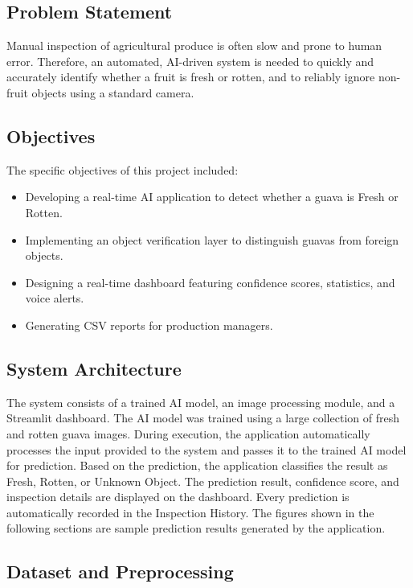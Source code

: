 \subsection{Problem Statement}

Manual inspection of agricultural produce is often slow and prone to human error. Therefore, an automated, AI-driven system is needed to quickly and accurately identify whether a fruit is fresh or rotten, and to reliably ignore non-fruit objects using a standard camera.

\subsection{Objectives}

The specific objectives of this project included:
\begin{itemize}[leftmargin=1.5cm]
    \item Developing a real-time AI application to detect whether a guava is Fresh or Rotten.
    \item Implementing an object verification layer to distinguish guavas from foreign objects.
    \item Designing a real-time dashboard featuring confidence scores, statistics, and voice alerts.
    \item Generating CSV reports for production managers.
\end{itemize}

\subsection{System Architecture}

The system consists of a trained AI model, an image processing module, and a Streamlit dashboard. The AI model was trained using a large collection of fresh and rotten guava images. During execution, the application automatically processes the input provided to the system and passes it to the trained AI model for prediction. Based on the prediction, the application classifies the result as Fresh, Rotten, or Unknown Object. The prediction result, confidence score, and inspection details are displayed on the dashboard. Every prediction is automatically recorded in the Inspection History. The figures shown in the following sections are sample prediction results generated by the application.

\subsection{Dataset and Preprocessing}

